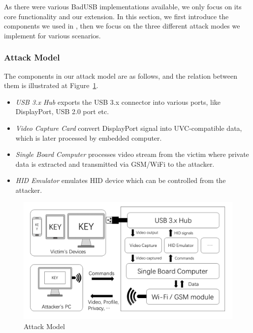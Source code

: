 As there were various BadUSB implementations available, we only focus on its
core functionality and our extension. In this section, we first introduce the
components we used in \tool, then we focus on the three different attack modes
we implement for various scenarios.

\subsubsection{Attack Model}

The components in our attack model are as follows, and the relation between
them is illustrated at Figure~\ref{fig:attack_model}. 

\begin{itemize}
	\item\textit{USB 3.x Hub} exports the USB 3.x connector into various ports, like DisplayPort, USB 2.0 port etc.
	\item\textit{Video Capture Card} convert DisplayPort signal into UVC-compatible data, which is later processed by embedded computer.
	\item\textit{Single Board Computer} processes video stream from the victim where private data is extracted and transmitted via GSM/WiFi to the attacker.
	\item\textit{HID Emulator} emulates HID device which can be controlled from the attacker.
\end{itemize}


\begin{figure}[t]
	\centering
	\includegraphics[width=\linewidth]{./Figs/attack_model.png}
	\caption{Attack Model}%
	\label{fig:attack_model}
\end{figure}

